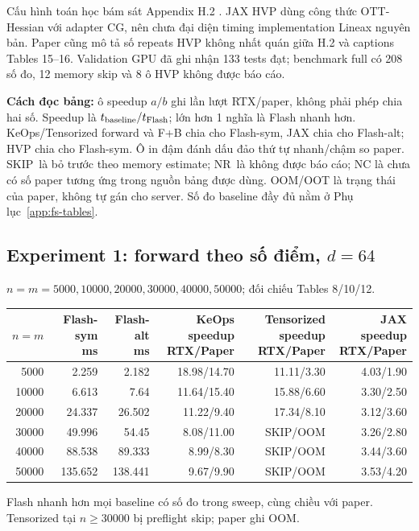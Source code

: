 \documentclass[11pt,a4paper]{article}
\newcommand{\NR}{\textnormal{NR}}
\newcommand{\SKIP}{\textnormal{SKIP}}
\begin{document}
Cấu hình toán học bám sát Appendix H.2 \cite{flashpaper}. JAX HVP dùng công
thức OTT-Hessian với adapter CG, nên chưa đại diện timing implementation
Lineax nguyên bản. Paper cũng mô tả số repeats HVP không nhất quán giữa
H.2 và captions Tables 15--16. Validation GPU đã ghi nhận 133 tests đạt;
benchmark full có 208 số đo, 12 memory skip và 8 ô HVP không được báo cáo.

\textbf{Cách đọc bảng:} ô speedup $a/b$ ghi lần lượt RTX/paper, không phải
phép chia hai số. Speedup là $t_{\rm baseline}/t_{\rm Flash}$; lớn hơn 1
nghĩa là Flash nhanh hơn. KeOps/Tensorized forward và F+B chia cho Flash-sym,
JAX chia cho Flash-alt; HVP chia cho Flash-sym. Ô in đậm đánh dấu đảo thứ tự
nhanh/chậm so paper. \SKIP\ là bỏ trước theo memory estimate; \NR\ là không
được báo cáo; NC là chưa có số paper tương ứng trong nguồn bảng được dùng.
OOM/OOT là trạng thái của paper, không tự gán cho server. Số đo baseline
đầy đủ nằm ở Phụ lục~\ref{app:fs-tables}.

\subsection{Experiment 1: forward theo số điểm, $d=64$}
$n=m=5000,10000,20000,30000,40000,50000$; đối chiếu Tables 8/10/12.
\begin{center}\footnotesize
\setlength{\tabcolsep}{5pt}
\begin{tabular}{@{}rrrrrr@{}}
\toprule
$n=m$ & \shortstack{Flash-sym\\ms} & \shortstack{Flash-alt\\ms} & \shortstack{KeOps speedup\\RTX/Paper} & \shortstack{Tensorized speedup\\RTX/Paper} & \shortstack{JAX speedup\\RTX/Paper} \\
\midrule
5000 & 2.259 & 2.182 & 18.98/14.70 & 11.11/3.30 & 4.03/1.90 \\
10000 & 6.613 & 7.64 & 11.64/15.40 & 15.88/6.60 & 3.30/2.50 \\
20000 & 24.337 & 26.502 & 11.22/9.40 & 17.34/8.10 & 3.12/3.60 \\
30000 & 49.996 & 54.45 & 8.08/11.00 & \SKIP/OOM & 3.26/2.80 \\
40000 & 88.538 & 89.333 & 8.99/8.30 & \SKIP/OOM & 3.44/3.60 \\
50000 & 135.652 & 138.441 & 9.67/9.90 & \SKIP/OOM & 3.53/4.20 \\
\bottomrule
\end{tabular}
\end{center}
Flash nhanh hơn mọi baseline có số đo trong sweep, cùng chiều với paper.
Tensorized tại $n\geq30000$ bị preflight skip; paper ghi OOM.
\end{document}
